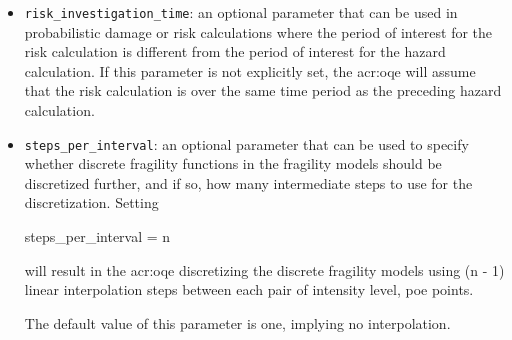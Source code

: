 \begin{itemize}

  \item \Verb+risk_investigation_time+: an optional parameter that can be used
    in probabilistic damage or risk calculations where the period of interest
    for the risk calculation is different from the period of interest for the 
    hazard calculation. If this parameter is not explicitly set, the 
    \glsdesc{acr:oqe} will assume that the risk calculation is over the same 
    time period as the preceding hazard calculation.

  \item \Verb+steps_per_interval+: an optional parameter that can be used to
    specify whether discrete fragility functions in the fragility models should
    be discretized further, and if so, how many intermediate steps to use for
    the discretization. Setting 

    steps\_per\_interval = n

    will result in the \glsdesc{acr:oqe} discretizing the discrete fragility
    models using (n - 1) linear interpolation steps between each pair of 
    {intensity level, poe} points.

    The default value of this parameter is one, implying no interpolation.

\end{itemize}
